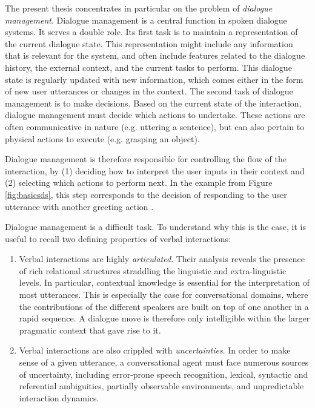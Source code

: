 The present thesis concentrates in particular on the problem of \textit{dialogue management}.  Dialogue management is a central function in spoken dialogue systems.  It serves a double role. 
Its first task is to maintain a representation of the current dialogue state. This representation might include any information that is relevant for the system, and often include features related to the dialogue history, the external context, and the current tasks to perform.  This dialogue state is regularly updated with new information, which comes either in the form of new user utterances or changes in the context. The second task of dialogue management is to make decisions.  Based on the current state of the interaction, dialogue management must decide which actions to undertake. These actions are often communicative in nature (e.g. uttering a sentence), but can also pertain to physical actions to execute (e.g. grasping an object). 

Dialogue management is therefore responsible for controlling the flow of the interaction, by (1) deciding how to interpret the user inputs in their context and (2) selecting which actions to perform next. In the example from Figure \ref{fig:basicsds}, this step corresponds to the decision of responding to the user utterance  with another greeting action . 

Dialogue management is a difficult task. To understand why this is the case, it is useful to recall two defining properties of verbal interactions:
\begin{enumerate}
\item Verbal interactions are highly \textit{articulated}.  Their analysis reveals the presence of rich relational structures straddling the linguistic and extra-linguistic levels. 
In particular, contextual knowledge is essential for the interpretation of most utterances. This is especially the case for conversational domains, where the contributions of the different speakers are built on top of one another in a rapid sequence. A dialogue move is therefore only intelligible within the larger pragmatic context that gave rise to it. 
\item Verbal interactions are also crippled with \textit{uncertainties}.  In order to make sense of a given utterance, a conversational agent must face numerous sources of uncertainty, including error-prone speech recognition, lexical,  syntactic and referential ambiguities, partially observable environments, and unpredictable interaction dynamics.  
\end{enumerate} 

